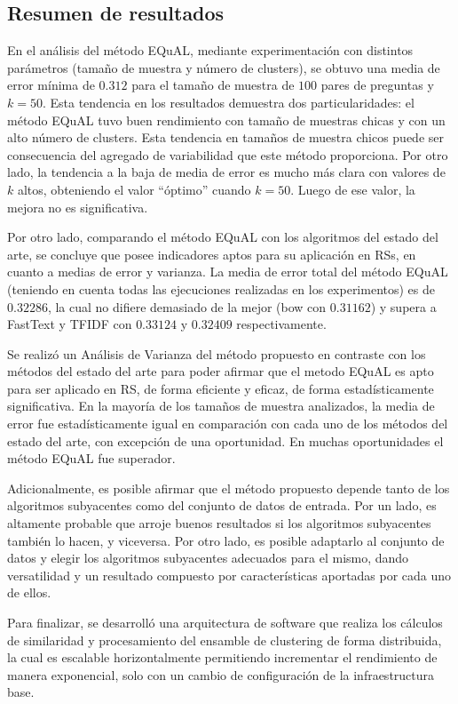 \subsection{Resumen de resultados}

En el análisis del método EQuAL, mediante experimentación con distintos parámetros (tamaño de muestra y número de clusters), se obtuvo una media de error mínima de \(0.312\) para el tamaño de muestra de \(100\) pares de preguntas y \(k = 50\). Esta tendencia en los resultados demuestra dos particularidades: el método EQuAL tuvo buen rendimiento con tamaño de muestras chicas y con un alto número de clusters. Esta tendencia en tamaños de muestra chicos puede ser consecuencia del agregado de variabilidad que este método proporciona. Por otro lado, la tendencia a la baja de media de error es mucho más clara con valores de \(k\) altos, obteniendo el valor “óptimo” cuando \(k = 50\). Luego de ese valor, la mejora no es significativa.

\bigskip Por otro lado, comparando el método EQuAL con los algoritmos del estado del arte, se concluye que posee indicadores aptos para su aplicación en RSs, en cuanto a medias de error y varianza. La media de error total del método EQuAL (teniendo en cuenta todas las ejecuciones realizadas en los experimentos) es de \(0.32286\), la cual no difiere demasiado de la mejor (bow con \(0.31162\)) y supera a FastText y TFIDF con \(0.33124\) y \(0.32409\) respectivamente.

\bigskip Se realizó un Análisis de Varianza del método propuesto en contraste con los métodos del estado del arte para poder afirmar que el metodo EQuAL es apto para ser aplicado en RS, de forma eficiente y eficaz, de forma estadísticamente significativa. En la mayoría de los tamaños de muestra analizados, la media de error fue estadísticamente igual en comparación con cada uno de los métodos del estado del arte, con excepción de una oportunidad. En muchas oportunidades el método EQuAL fue superador.

\bigskip Adicionalmente, es posible afirmar que el método propuesto depende tanto de los algoritmos subyacentes como del conjunto de datos de entrada. Por un lado, es altamente probable que arroje buenos resultados si los algoritmos subyacentes también lo hacen, y viceversa. Por otro lado, es posible adaptarlo al conjunto de datos y elegir los algoritmos subyacentes adecuados para el mismo, dando versatilidad y un resultado compuesto por características aportadas por cada uno de ellos.

\bigskip Para finalizar, se desarrolló una arquitectura de software que realiza los cálculos de similaridad y procesamiento del ensamble de clustering de forma distribuida, la cual es escalable horizontalmente permitiendo incrementar el rendimiento de manera exponencial, solo con un cambio de configuración de la infraestructura base.
